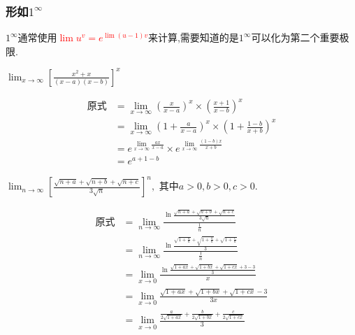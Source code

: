 \documentclass[12pt, a4paper, oneside, UTF8]{ctexbook}
\begin{document}
\begin{sloppypar}
    \subsubsection{形如$1^{\infty}$}
         $1 ^ \infty$通常使用\textcolor{red}{$\lim u^v=e^{\lim (u-1)v}$}来计算,需要知道的是$1^\infty$可以化为第二个重要极限.
              \begin{problem}
              $\lim _{x \to \infty}\left[ \frac{x^2 + x}{(x-a)(x-b)}\right]^x$
              \end{problem}
              \begin{solution}
                  \begin{align*}
                      \text{原式} & = \lim _{x \to \infty} \left(\frac{x}{x-a}\right)^x \times \left(\frac{x+1}{x-b}\right)^x         \\
                                & =  \lim _{x \to \infty} \left(1+\frac{a}{x-a} \right)^x \times \left( 1+\frac{1-b}{x+b} \right)^x \\
                                & = e^{\lim _{x \to \infty} \frac{ax}{x-a} } \times e^{\lim _{x \to \infty} \frac{(1-b)x}{x+b}}     \\
                                & =e^{a+1-b}
                  \end{align*}
              \end{solution}
              \begin{problem}
              $\lim_{n\to\infty}\left[\frac{\sqrt{n+a}+\sqrt{n+b}+\sqrt{n+c}}{3\sqrt{n}}\right]^n,\text{ 其中}a>0,b>0,c>0.$
              \end{problem}
              \begin{solution}
                  \begin{align*}
                      \text{原式} & =   \lim_{n\rightarrow\infty}\frac{\ln\frac{\sqrt{n+a}+\sqrt{n+b}+\sqrt{n+c}}{3\sqrt{n}}}{\frac{1}{n}}              \\
                                & = \lim_{n\to\infty}\frac{\ln\frac{\sqrt{1+\frac{a}{n}}+\sqrt{1+\frac{b}{n}}+\sqrt{1+\frac{c}{n}}}{3}}{\frac{1}{n}}  \\
                                & = \lim_{x\to0}\frac{\ln\frac{\sqrt{1+ax}+\sqrt{1+bx}+\sqrt{1+cx}+3-3}{3}}{x}                                        \\
                                & = \lim_{x\rightarrow0}\frac{\sqrt{1+ax}+\sqrt{1+bx}+\sqrt{1+cx}-3}{3x}                                              \\
                                & = \operatorname*{lim}_{x\rightarrow0}\frac{\frac{a}{2\sqrt{1+ax}}+\frac{b}{2\sqrt{1+bx}}+\frac{c}{2\sqrt{1+cx}}}{3} \\

\end{align*}
\end{solution}
\end{sloppypar}
\end{document}
